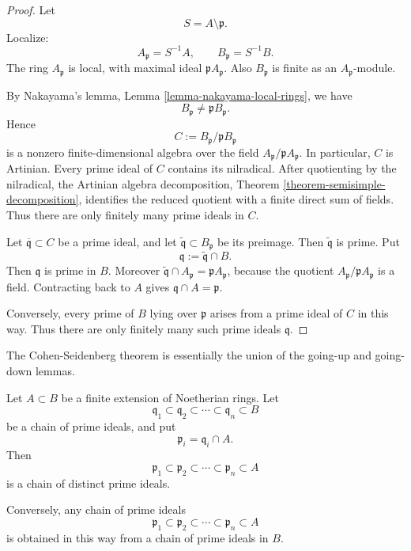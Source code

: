 \begin{proof}
Let
$$
S=A\setminus \mathfrak{p}.
$$
Localize:
$$
A_{\mathfrak{p}}=S^{-1}A,\qquad
B_{\mathfrak{p}}=S^{-1}B.
$$
The ring $A_{\mathfrak{p}}$ is local,
with maximal ideal
$\mathfrak{p}A_{\mathfrak{p}}$.
Also $B_{\mathfrak{p}}$ is finite as an
$A_{\mathfrak{p}}$-module.

By Nakayama's lemma,
Lemma
\ref{lemma-nakayama-local-rings},
we have
$$
B_{\mathfrak{p}}\neq
\mathfrak{p}B_{\mathfrak{p}}.
$$
Hence
$$
C:=B_{\mathfrak{p}}/
\mathfrak{p}B_{\mathfrak{p}}
$$
is a nonzero finite-dimensional algebra
over the field
$A_{\mathfrak{p}}/
\mathfrak{p}A_{\mathfrak{p}}$.
In particular, $C$ is Artinian.
Every prime ideal of $C$ contains its
nilradical.
After quotienting by the nilradical,
the Artinian algebra decomposition,
Theorem
\ref{theorem-semisimple-decomposition},
identifies the reduced quotient with a
finite direct sum of fields.
Thus there are only finitely many prime
ideals in $C$.

Let $\overline{\mathfrak{q}}\subset C$
be a prime ideal, and let
$\tilde{\mathfrak{q}}\subset
B_{\mathfrak{p}}$
be its preimage.
Then $\tilde{\mathfrak{q}}$ is prime.
Put
$$
\mathfrak{q}:=
\tilde{\mathfrak{q}}\cap B.
$$
Then $\mathfrak{q}$ is prime in $B$.
Moreover
$\tilde{\mathfrak{q}}\cap
A_{\mathfrak{p}}
=\mathfrak{p}A_{\mathfrak{p}}$,
because the quotient
$A_{\mathfrak{p}}/
\mathfrak{p}A_{\mathfrak{p}}$
is a field.
Contracting back to $A$ gives
$\mathfrak{q}\cap A=\mathfrak{p}$.

Conversely, every prime of $B$ lying over
$\mathfrak{p}$ arises from a prime ideal
of $C$ in this way.
Thus there are only finitely many such
prime ideals $\mathfrak{q}$.
\end{proof}

\noindent
The Cohen-Seidenberg theorem is essentially
the union of the going-up and going-down
lemmas.

\begin{theorem}
\label{theorem-cohen-seidenberg}
Let $A\subset B$ be a finite extension
of Noetherian rings.
Let
$$
\mathfrak{q}_1\subset \mathfrak{q}_2
\subset \cdots \subset \mathfrak{q}_n
\subset B
$$
be a chain of prime ideals, and put
$$
\mathfrak{p}_i=\mathfrak{q}_i\cap A.
$$
Then
$$
\mathfrak{p}_1\subset \mathfrak{p}_2
\subset \cdots \subset \mathfrak{p}_n
\subset A
$$
is a chain of distinct prime ideals.

Conversely, any chain of prime ideals
$$
\mathfrak{p}_1\subset \mathfrak{p}_2
\subset \cdots \subset \mathfrak{p}_n
\subset A
$$
is obtained in this way from a chain of
prime ideals in $B$.
\end{theorem}

